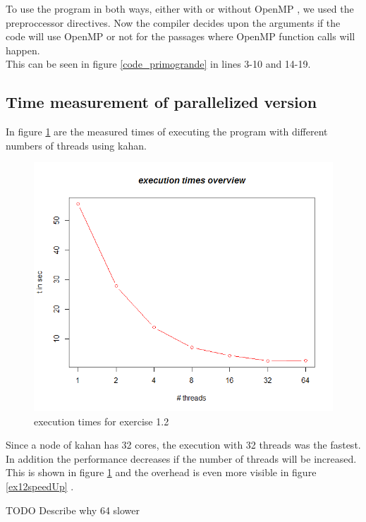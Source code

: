 \documentclass[11pt,a4paper]{article}
\begin{document}
To use the program in both ways, either with or without OpenMP , we used the preproccessor directives. Now the compiler decides upon the arguments if the code will use OpenMP or not for the passages where OpenMP function calls will happen.\\

This can be seen in figure \ref{code_primogrande} in lines 3-10 and 14-19.

\pagebreak
\subsection{Time measurement of parallelized version}

In figure \ref{ex12execution} are the measured times of executing the program with different numbers of threads using kahan.\\

\begin{figure}[h]
\centering
  \includegraphics[scale=0.35]{statistics/Ex12ResultGraph.png}
	\caption{execution times for exercise 1.2}
	\label{ex12execution}
\end{figure}


Since a node of kahan has 32 cores, the execution with 32 threads was the fastest. In addition the performance decreases if the number of threads will be increased. This is shown in figure \ref{ex12execution} and the overhead is even more visible in figure \ref{ex12speedUp} .

TODO Describe why 64 slower
\end{document}
